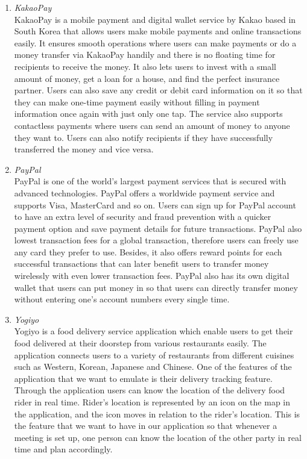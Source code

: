\documentclass[conference]{IEEEtran}
\begin{document}
\begin{enumerate}
\item \textit{KakaoPay }\\ 
KakaoPay is a mobile payment and digital wallet service by Kakao based in \indent South Korea that allows users make mobile payments and online transactions easily. It ensures smooth operations where users can make payments or do a money transfer via KakaoPay handily and there is no floating time for recipients to receive the money. It also lets users to invest with a small amount of money, get a loan for a house, and find the perfect insurance partner. Users can also save any credit or debit card information on it so that they can make one-time payment easily without filling in payment information once again with just only one tap. The service also supports contactless payments where users can send an amount of money to anyone they want to. Users can also notify recipients if they have successfully transferred the money and vice versa. \\
\item \textit{PayPal} \\
PayPal is one of the world’s largest payment services that is secured with advanced technologies. PayPal offers a worldwide payment service and supports Visa, MasterCard and so on. Users can sign up for PayPal account to have an extra level of security and fraud prevention with a quicker payment option and save payment details for future transactions. PayPal also lowest transaction fees for a global transaction, therefore users can freely use any card they prefer to use. Besides, it also offers reward points for each successful transactions that can later benefit users to transfer money wirelessly with even lower transaction fees. PayPal also has its own digital wallet that users can put money in so that users can directly transfer money without entering one’s account numbers every single time.\\
\item \textit{Yogiyo }\\
Yogiyo is a food delivery service application which enable users to get their food delivered at their doorstep from various restaurants easily. The application connects users to a variety of restaurants from different cuisines such as Western, Korean, Japanese and Chinese. One of the features of the application that we want to emulate is their delivery tracking feature. Through the application users can know the location of the delivery food rider in real time. Rider’s location is represented by an icon on the map in the application, and the icon moves in relation to the rider’s location. This is the feature that we want to have in our application so that whenever a meeting is set up, one person can know the location of the other party in real time and plan accordingly.\\

\end{enumerate}
\end{document}
